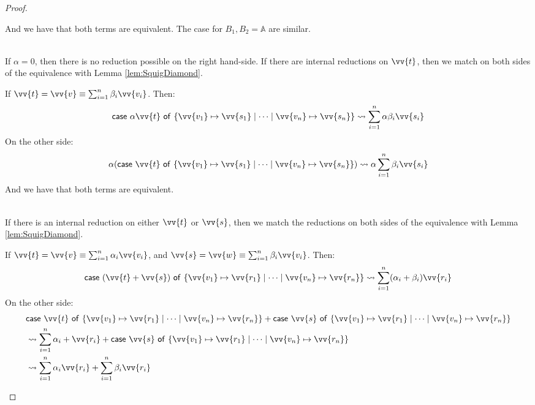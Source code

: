 \documentclass[runningheads,orivec,envcountsame,envcountsect]{llncs}
\newcommand\AbsBasis{\ensuremath{\mathbb{A}}}
\def\gencase#1#2#3#4#5{\ensuremath{\mathsf{case}~#1~\mathsf{of}~\{#2\mapsto #4 \mid \dotsb \mid #3\mapsto #5\}}}
\def\lraneq{\rightsquigarrow}
\begin{document}
\begin{proof}
\begin{description}
      And we have that both terms are equivalent. The case for $B_1,B_2=\AbsBasis$ are similar.

    \item[\parbox{.55\linewidth}{\begin{align*}
      &\gencase{\alpha \vv{t}}{\vv{v_1}}{\vv{v_n}}{\vv{s_1}}{\vv{s_n}}\equiv\\
      &\alpha(\gencase{\vv{t}}{\vv{v_1}}{\vv{v_n}}{\vv{s_1}}{\vv{s_n}})
    \end{align*}}:] \hfill\\
    
    If $\alpha=0$, then there is no reduction possible on the right hand-side. If there are internal reductions on $\vv{t}$, then we match on both sides of the equivalence with Lemma \ref{lem:SquigDiamond}.
    
    If $\vv{t}=\vv{v}\equiv\sum_{i=1}^n\beta_i \vv{v_i}$. Then:
    \begin{align*}
      \gencase{\alpha \vv{t}}{\vv{v_1}}{\vv{v_n}}{\vv{s_1}}{\vv{s_n}}\lraneq \sum_{i=1}^n\alpha\beta_i \vv{s_i}
    \end{align*}
    On the other side:
    \begin{align*}
      \alpha(\gencase{\vv{t}}{\vv{v_1}}{\vv{v_n}}{\vv{s_1}}{\vv{s_n}})\lraneq \alpha\sum_{i=1}^n\beta_i \vv{s_i}
    \end{align*}
    And we have that both terms are equivalent.

    \item[\parbox{.55\linewidth}{\begin{align*}
      &\gencase{(\vv{t}+\vv{s})}{\vv{v_1}}{\vv{v_n}}{\vv{r_1}}{\vv{r_n}}\equiv\\ 
      &\gencase{\vv{t}}{\vv{v_1}}{\vv{v_n}}{\vv{r_1}}{\vv{r_n}}+\\
      &\gencase{\vv{s}}{\vv{v_1}}{\vv{v_n}}{\vv{r_1}}{\vv{r_n}}  
    \end{align*}}:]\hfill\\

    If there is an internal reduction on either $\vv{t}$ or $\vv{s}$, then we match the reductions on both sides of the equivalence with Lemma \ref{lem:SquigDiamond}.

    If $\vv{t}=\vv{v}\equiv\sum_{i=1}^n\alpha_i \vv{v_i}$, and $\vv{s}=\vv{w}\equiv\sum_{i=1}^n\beta_i \vv{v_i}$. Then:
    \begin{align*}
      \gencase{(\vv{t}+\vv{s})}{\vv{v_1}}{\vv{v_n}}{\vv{r_1}}{\vv{r_n}}\lraneq \sum_{i=1}^n (\alpha_i+\beta_i) \vv{r_i}
    \end{align*}
    On the other side:
    \begin{align*}
      &\gencase{\vv{t}}{\vv{v_1}}{\vv{v_n}}{\vv{r_1}}{\vv{r_n}}+\gencase{\vv{s}}{\vv{v_1}}{\vv{v_n}}{\vv{r_1}}{\vv{r_n}}\\
      &\lraneq \sum_{i=1}^n \alpha_i+ \vv{r_i} + \gencase{\vv{s}}{\vv{v_1}}{\vv{v_n}}{\vv{r_1}}{\vv{r_n}}\\
      &\lraneq \sum_{i=1}^n \alpha_i \vv{r_i} + \sum_{i=1}^n \beta_i \vv{r_i}\\
    \end{align*}


\end{description}
\end{proof}
\end{document}
